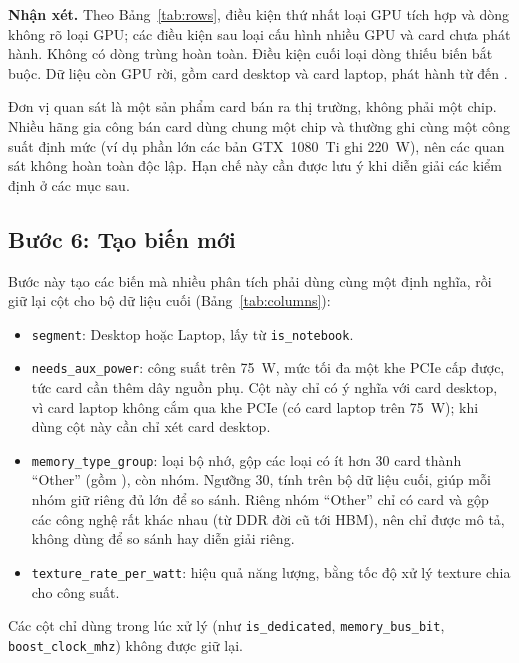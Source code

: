 \textbf{Nhận xét.} Theo Bảng~\ref{tab:rows}, điều kiện thứ nhất loại \PreIntegrated{} GPU
tích hợp và \PreUnknownDedicated{} dòng không rõ loại GPU; các điều kiện sau loại
\PreMultiGpuRemoved{} cấu hình nhiều GPU và \PreUnreleasedRemoved{} card chưa phát hành.
Không có dòng trùng hoàn toàn. Điều kiện cuối loại \PreIncompleteRemoved{} dòng thiếu
biến bắt buộc. Dữ liệu còn \PreRowsFinal{} GPU rời, gồm \PreDesktop{} card desktop và \PreLaptop{}
card laptop, phát hành từ \PreReleaseYearMin{} đến \PreReleaseYearMax.

Đơn vị quan sát là một sản phẩm card bán ra thị trường, không phải một chip. Nhiều hãng gia
công bán card dùng chung một chip và thường ghi cùng một công suất định mức (ví dụ phần lớn
các bản GTX~1080~Ti ghi 220~W), nên các quan sát không hoàn toàn độc lập. Hạn chế này
cần được lưu ý khi diễn giải các kiểm định ở các mục sau.

\subsection{Bước 6: Tạo biến mới}

Bước này tạo các biến mà nhiều phân tích phải dùng cùng một định nghĩa, rồi giữ lại
\PreColsFinal{} cột cho bộ dữ liệu cuối (Bảng~\ref{tab:columns}):
\begin{itemize}
  \item \texttt{segment}: Desktop hoặc Laptop, lấy từ \texttt{is\_notebook}.
  \item \texttt{needs\_aux\_power}: công suất trên 75~W, mức tối đa một khe PCIe cấp được,
    tức card cần thêm dây nguồn phụ. Cột này chỉ có ý nghĩa với card desktop, vì card
    laptop không cắm qua khe PCIe (có \PreLaptopAuxPower{} card laptop trên 75~W); khi
    dùng cột này cần chỉ xét card desktop.
  \item \texttt{memory\_type\_group}: loại bộ nhớ, gộp các loại có ít hơn 30 card thành
    ``Other'' (gồm \PreMemoryTypeOtherNames), còn \PreMemoryTypeGroups{} nhóm.
    Ngưỡng 30, tính trên bộ dữ liệu cuối, giúp mỗi nhóm giữ riêng đủ lớn để so sánh. Riêng
    nhóm ``Other'' chỉ có \PreMemoryTypeOtherSize{} card và gộp các công nghệ rất khác
    nhau (từ DDR đời cũ tới HBM), nên chỉ được mô tả, không dùng để so sánh hay diễn giải
    riêng.
  \item \texttt{texture\_rate\_per\_watt}: hiệu quả năng lượng, bằng tốc độ xử lý texture
    chia cho công suất.
\end{itemize}
Các cột chỉ dùng trong lúc xử lý (như \texttt{is\_dedicated}, \texttt{memory\_bus\_bit},
\texttt{boost\_clock\_mhz}) không được giữ lại.

